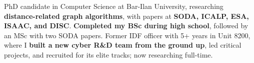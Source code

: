
\begin{cvparagraph}
PhD candidate in Computer Science at Bar-Ilan University, researching \textbf{distance-related graph algorithms}, with papers at \textbf{SODA, ICALP, ESA, ISAAC, and DISC}.
\textbf{Completed my BSc during high school}, followed by an MSc with two SODA papers.
Former IDF officer with 5+ years in Unit 8200, where I \textbf{built a new cyber R\&D team from the ground up}, led critical projects, and recruited for its elite tracks; now researching full-time.
\end{cvparagraph}